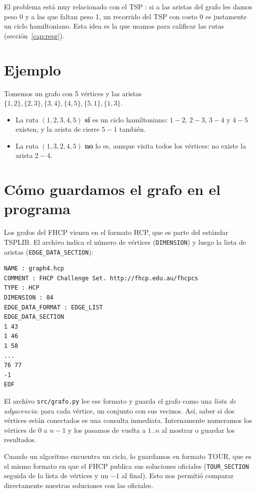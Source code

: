 El problema está muy relacionado con el TSP \cite{sa3}: si a las aristas del grafo les damos peso
0 y a las que faltan peso 1, un recorrido del TSP con costo 0 es justamente un ciclo hamiltoniano.
Esta idea es la que usamos para calificar las rutas (sección~\ref{cap:repr}).

\section{Ejemplo}
Tomemos un grafo con 5 vértices y las aristas
$\{1,2\},\{2,3\},\{3,4\},\{4,5\},\{5,1\},\{1,3\}$.

\begin{itemize}
  \item La ruta $(1,2,3,4,5)$ \textbf{sí} es un ciclo hamiltoniano: $1\!-\!2$, $2\!-\!3$,
        $3\!-\!4$ y $4\!-\!5$ existen, y la arista de cierre $5\!-\!1$ también.
  \item La ruta $(1,3,2,4,5)$ \textbf{no} lo es, aunque visita todos los vértices: no existe la
        arista $2\!-\!4$.
\end{itemize}

\section{Cómo guardamos el grafo en el programa}
Los grafos del FHCP vienen en el formato HCP, que es parte del estándar TSPLIB. El archivo
indica el número de vértices (\texttt{DIMENSION}) y luego la lista de aristas
(\texttt{EDGE\_DATA\_SECTION}):

\begin{verbatim}
NAME : graph4.hcp
COMMENT : FHCP Challenge Set. http://fhcp.edu.au/fhcpcs
TYPE : HCP
DIMENSION : 84
EDGE_DATA_FORMAT : EDGE_LIST
EDGE_DATA_SECTION
1 43
1 46
1 58
...
76 77
-1
EOF
\end{verbatim}

El archivo \texttt{src/grafo.py} lee ese formato y guarda el grafo como una \emph{lista de
adyacencia}: para cada vértice, un conjunto con sus vecinos. Así, saber si dos vértices están
conectados es una consulta inmediata. Internamente numeramos los vértices de $0$ a $n-1$ y los
pasamos de vuelta a $1..n$ al mostrar o guardar los resultados.

Cuando un algoritmo encuentra un ciclo, lo guardamos en formato TOUR, que es el mismo formato en
que el FHCP publica sus soluciones oficiales (\texttt{TOUR\_SECTION} seguida de la lista de
vértices y un $-1$ al final). Esto nos permitió comparar directamente nuestras soluciones con las
oficiales.
